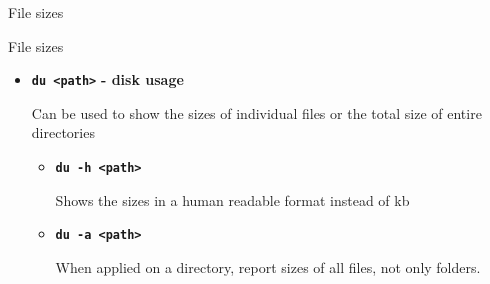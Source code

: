 \documentclass[aspectratio=1610]{beamer}
\newcommand\curtitle{}
\newcommand\command[1]{\alert{\textbf{\texttt{#1}}}}
\begin{document}
\renewcommand\curtitle{File sizes}

\begin{frame}[c]
    \Huge \curtitle
\end{frame}


\begin{frame}[c]{\curtitle}
    \begin{itemize}[<+->]\setlength\itemsep{1em}
        \item \command{du <path>} \textbf{- disk usage} 

            Can be used to show the sizes of individual files or the total size of entire
            directories
            \begin{itemize}[<.->]
                \item \command{du -h <path>}

                    Shows the sizes in a human readable format instead of kb
                \item \command{du -a <path>}

                    When applied on a directory, report sizes of all files, not only folders.
            \end{itemize}
    \end{itemize}
\end{frame}

\end{document}
